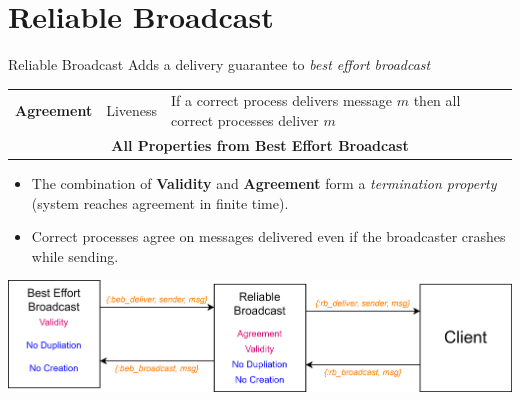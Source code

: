 \inputminted{elixir}{broadcast/code/perfect_point_to_point_links.ex}

\section{Reliable Broadcast}
\begin{definitionbox}{Reliable Broadcast}
    Adds a delivery guarantee to \textit{best effort broadcast}  
    \begin{center}
        \begin{tabular}{l l p{}}
            \textbf{Agreement} & Liveness & If a correct process delivers message $m$ then all correct processes deliver $m$ \\
            \multicolumn{3}{c}{\textbf{All Properties from Best Effort Broadcast}} \\
        \end{tabular}
    \end{center}
    \begin{itemize}
        \item The combination of \textbf{Validity} and \textbf{Agreement} form a \textit{termination property} (system reaches agreement in finite time).
        \item Correct processes agree on messages delivered even if the broadcaster crashes while sending.
    \end{itemize}
\end{definitionbox}
\begin{center}
    \includegraphics[width=.8\textwidth]{broadcast/images/reliable_broadcast.drawio.png}
  \end{center}


